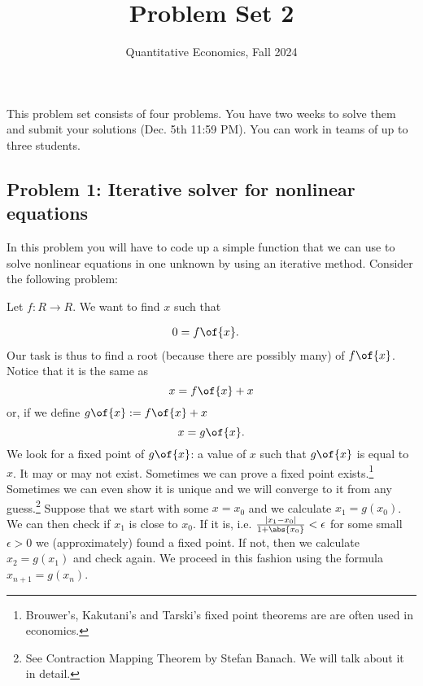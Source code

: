 \documentclass[english,hyperref={pdftex,pdfpagemode=UseNone,hidelinks}]{tufte-handout}
\title{Problem Set 2}
\author{Quantitative Economics, Fall 2024}
\begin{document}
\maketitle
This problem set consists of four problems. You have two weeks to solve them and submit your solutions (Dec. 5th 11:59 PM). You can work in teams of up to three students.   

\subsection*{Problem 1: Iterative solver for nonlinear equations}

In this problem you will have to code up a simple function that we
can use to solve nonlinear equations in one unknown by using an iterative
method. Consider the following problem: 

Let $f:R\rightarrow R$. We want to find $x$ such that

\begin{align*}
0 & =f\of{x}.
\end{align*}
Our task is thus to find a root (because there are possibly many)
of $f\of{x}$. Notice that it is the same as 
\[
x=f\of{x}+x
\]
or, if we define $g\of{x}:=f\of{x}+x$ 
\[
x=g\of{x}.
\]
We look for a fixed point of $g\of{x}$: a value of $x$ such
that $g\of{x}$ is equal to $x$. It may or may not exist.
Sometimes we can prove a fixed point exists.\footnote{Brouwer's, Kakutani's and Tarski's fixed point theorems are are often used in economics.} Sometimes we can even show it is unique and we will converge to it
from any guess.\footnote{See Contraction Mapping Theorem by Stefan Banach. We will talk about
it in detail.} Suppose that we start with some $x=x_{0}$ and we calculate $x_{1}=g\left(x_{0}\right)$.
We can then check if $x_{1}$ is close to $x_{0}$. If it is, i.e.
$\frac{\left|x_{1}-x_{0}\right|}{1+\abs{x_0}}<\epsilon$ for some small $\epsilon>0$
we (approximately) found a fixed point. If not, then we calculate
$x_{2}=g\left(x_{1}\right)$ and check again. We proceed in this fashion
using the formula $x_{n+1}=g\left(x_{n}\right)$. 
\end{document}

